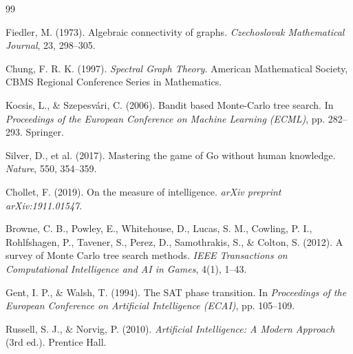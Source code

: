 \documentclass[11pt]{article}
\begin{document}
\begin{thebibliography}{99}

Fiedler, M. (1973).
\newblock Algebraic connectivity of graphs.
\newblock \textit{Czechoslovak Mathematical Journal}, 23, 298--305.

Chung, F. R. K. (1997).
\newblock \textit{Spectral Graph Theory}.
\newblock American Mathematical Society, CBMS Regional Conference Series in Mathematics.

Kocsis, L., \& Szepesv\'{a}ri, C. (2006).
\newblock Bandit based Monte-Carlo tree search.
\newblock In \textit{Proceedings of the European Conference on Machine Learning (ECML)},
  pp. 282--293. Springer.

Silver, D., et al. (2017).
\newblock Mastering the game of Go without human knowledge.
\newblock \textit{Nature}, 550, 354--359.

Chollet, F. (2019).
\newblock On the measure of intelligence.
\newblock \textit{arXiv preprint arXiv:1911.01547}.

Browne, C. B., Powley, E., Whitehouse, D., Lucas, S. M., Cowling, P. I.,
Rohlfshagen, P., Tavener, S., Perez, D., Samothrakis, S., \& Colton, S. (2012).
\newblock A survey of Monte Carlo tree search methods.
\newblock \textit{IEEE Transactions on Computational Intelligence and AI in Games}, 4(1), 1--43.

Gent, I. P., \& Walsh, T. (1994).
\newblock The SAT phase transition.
\newblock In \textit{Proceedings of the European Conference on Artificial Intelligence (ECAI)},
  pp. 105--109.

Russell, S. J., \& Norvig, P. (2010).
\newblock \textit{Artificial Intelligence: A Modern Approach} (3rd ed.).
\newblock Prentice Hall.

\end{thebibliography}
\end{document}
